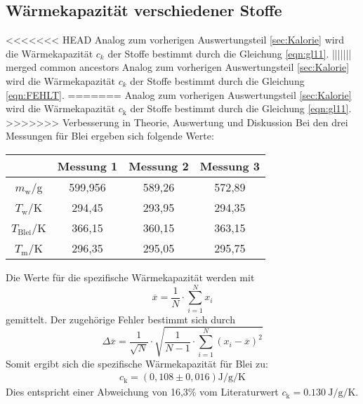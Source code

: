 \subsection{Wärmekapazität verschiedener Stoffe}
\label{sec:verschiedeneStoffe}
<<<<<<< HEAD
Analog zum vorherigen Auswertungsteil \ref{sec:Kalorie} wird die Wärmekapazität $c_k$ der Stoffe bestimmt durch die Gleichung \ref{eqn:gl11}.
||||||| merged common ancestors
Analog zum vorherigen Auswertungsteil \ref{sec:Kalorie} wird die Wärmekapazität $c_k$ der Stoffe bestimmt durch die Gleichung \ref{eqn:FEHLT}.
=======
Analog zum vorherigen Auswertungsteil \ref{sec:Kalorie} wird die Wärmekapazität $c_\text{k}$ der Stoffe bestimmt durch die Gleichung \eqref{eqn:gl11}.
>>>>>>> Verbesserung in Theorie, Auswertung und Diskussion
Bei den drei Messungen für Blei ergeben sich folgende Werte:
\begin{table}
  \centering
  \label{tab:WerteBlei}
  \begin{tabular}{c c c c}
   \toprule
   & Messung 1 & Messung 2 & Messung 3 \\
   \midrule
   $m_\text{w}$/g & 599,956 & 589,26 & 572,89 \\
   $T_\text{w}$/K & 294,45 & 293,95 & 294,35 \\
   $T_\text{Blei}$/K & 366,15 & 360,15 & 363,15 \\
   $T_\text{m}$/K & 296,35 & 295,05 & 295,75 \\
   \bottomrule
  \end{tabular}
\end{table}
Die Werte für die spezifische Wärmekapazität werden mit
\begin{equation}
  \overline{x} = \frac{1}{N} \cdot \sum_{i=1}^N x_i
\end{equation}
gemittelt. Der zugehörige Fehler bestimmt sich durch
\begin{equation}
  \Delta \overline{x} = \frac{1}{\sqrt{N}} \cdot \sqrt{\frac{1}{N-1} \cdot \sum_{i=1}^N \left(x_i - \overline{x}\right)^2}
\end{equation}
Somit ergibt sich die spezifische Wärmekapazität für Blei zu:
\begin{align*}
  c_\text{k} = \left(0,108 \pm 0,016 \right) \si{\joule\per\gram\per\kelvin}
\end{align*}
Dies entspricht einer Abweichung von 16,3\% vom Literaturwert $c_\text{k} = \SI{0,130}{\joule\per\gram\per\kelvin}$.

